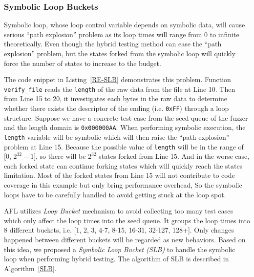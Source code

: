 \subsubsection{Symbolic Loop Buckets}
Symbolic loop, whose loop control variable depends on symbolic data, will cause serious ``path explosion'' problem as its loop times will range from 0 to infinite theoretically. 
Even though the hybrid testing method can ease the ``path explosion'' problem, but the states forked from the symbolic loop will quickly force the number of states to increase to the budget. 

 

The code snippet in Listing~\ref{RE-SLB} demonstrates this problem. Function \texttt{verify\_file} reads the \texttt{length} of the raw data from the file at Line 10. Then from Line 15 to 20, it investigates each bytes in the raw data to determine whether there exists the descriptor of the ending (i.e. \texttt{0xFF}) through a loop structure. Suppose we have a concrete test case from the seed queue of the fuzzer and the length domain is \texttt{0x000000AA}. 
When performing symbolic execution, the \texttt{length} variable will be symbolic which will then raise the ``path explosion'' problem at Line 15. Because the possible value of \texttt{length} will be in the range of [0, $2^{32}-1$], so there will be $2^{32}$ states forked from Line 15. And in the worse case, each forked state can continue forking states which will quickly reach the states limitation. 
Most of the forked states from Line 15 will not contribute to code coverage in this example but only bring performance overhead, So the symbolic loops have to be carefully handled to avoid getting stuck at the loop spot. 

AFL utilizes \emph{Loop Bucket} mechanism to avoid collecting too many test cases which only affect the loop times into the seed queue. It groups the loop times into 8 different buckets, i.e. [1, 2, 3, 4-7, 8-15, 16-31, 32-127, 128+]. Only changes happened between different buckets will be regarded as new behaviors. Based on this idea, we proposed a \textit{Symbolic Loop Bucket (SLB)} to handle the symbolic loop when performing hybrid testing. The algorithm of SLB is described in Algorithm~\ref{SLB}.

